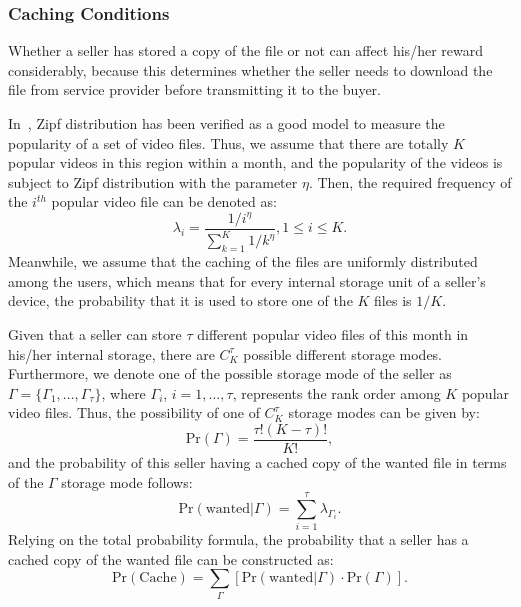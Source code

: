 \documentclass[11pt,draftcls]{IEEEtran}{\onecolumn}
\begin{document}
\subsubsection{Caching Conditions}

Whether a seller has stored a copy of the file or not can affect his/her reward considerably, because this determines whether the seller needs to download the file from service provider before transmitting it to the buyer.

In~\cite{17}, Zipf distribution has been verified as a good model to measure the popularity of a set of video files. Thus, we assume that there are totally $K$ popular videos in this region within a month, and the popularity of the videos is subject to Zipf distribution with the parameter $\eta$. Then, the required frequency of the $i^{th}$ popular video file can be denoted as:
\begin{equation}
{{\lambda }_{i}}=\frac{1/{{i}^{\eta }}}{\sum\nolimits_{k=1}^{K}{1/{{k}^{\eta }}}}, 1\le i\le K.
\end{equation}
Meanwhile, we assume that the caching of the files are uniformly distributed among the users, which means that for every internal storage unit of a seller's device, the probability that it is used to store one of the $K$ files is $1/K$.

Given that a seller can store $\tau$ different popular video files of this month in his/her internal storage, there are $C_{K}^{\tau }$ possible different storage modes. Furthermore, we denote one of the possible storage mode of the seller as $\Gamma=\{\Gamma_1,\ldots,\Gamma_\tau\}$, where $\Gamma_i$, $i=1,\ldots,\tau$, represents the rank order among $K$ popular video files. Thus, the possibility of one of $C_{K}^{\tau }$ storage modes can be given by:
\begin{equation}
\textrm{Pr}(\Gamma )=\frac{\tau !(K-\tau )!}{K!},
\end{equation}
and the probability of this seller having a cached copy of the wanted file in terms of the $\Gamma$ storage mode follows:
\begin{equation}
\textrm{Pr}(\textrm{wanted}|\Gamma)= \sum_{i=1}^\tau \lambda_{\Gamma_i}.
\end{equation}
Relying on the total probability formula, the probability that a seller has a cached copy of the wanted file can be constructed as:
\begin{equation}\label{PrCache}
\textrm{Pr}(\textrm{Cache})=\sum_{\Gamma} \left[\textrm{Pr}(\textrm{wanted}|\Gamma) \cdot \textrm{Pr}(\Gamma ) \right].
\end{equation}
\end{document}
